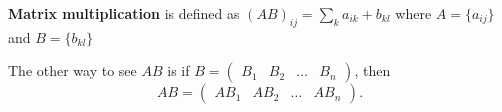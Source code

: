 \begin{definition}
	\textbf{Matrix multiplication} is defined as \( (AB)_{ij} = \sum_{k} a_{ik} + b_{kl}\) where \( A=\{a_{ij}\}   \) and \( B = \{b_{kl}\}   \)
\end{definition}

The other way to see \( AB \) is if \( B=\begin{pmatrix}
	B_{1} & B_{2} & \ldots & B_n
\end{pmatrix} \), then \[
	AB=\begin{pmatrix}
		AB_{1}&AB_{2}&\ldots &AB_n
	\end{pmatrix}
.\] 
